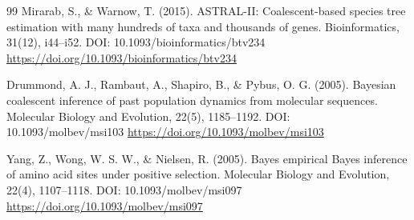 \documentclass[10pt,letterpaper]{article}
\begin{document}
\begin{thebibliography}{99}
 Mirarab, S., \& Warnow, T. (2015). ASTRAL-II: Coalescent-based species tree estimation with many hundreds of taxa and thousands of genes. Bioinformatics, 31(12), i44--i52. DOI: 10.1093/bioinformatics/btv234 \url{https://doi.org/10.1093/bioinformatics/btv234}

 Drummond, A. J., Rambaut, A., Shapiro, B., \& Pybus, O. G. (2005). Bayesian coalescent inference of past population dynamics from molecular sequences. Molecular Biology and Evolution, 22(5), 1185--1192. DOI: 10.1093/molbev/msi103 \url{https://doi.org/10.1093/molbev/msi103}

 Yang, Z., Wong, W. S. W., \& Nielsen, R. (2005). Bayes empirical Bayes inference of amino acid sites under positive selection. Molecular Biology and Evolution, 22(4), 1107--1118. DOI: 10.1093/molbev/msi097 \url{https://doi.org/10.1093/molbev/msi097}

\end{thebibliography}
\end{document}
